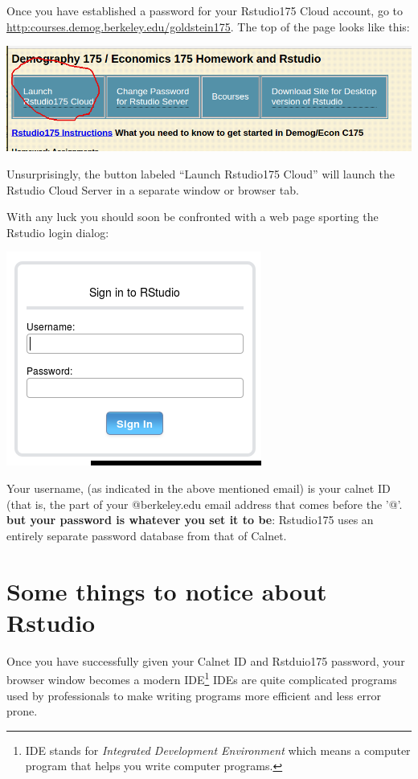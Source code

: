 \documentclass[11pt]{article}
\begin{document}
Once you have established a password for your Rstudio175 Cloud account, go to 
\url{http:courses.demog.berkeley.edu/goldstein175}.  The top of the page looks like this:

\includegraphics[scale=.5]{WebsiteTop}

Unsurprisingly, the button labeled ``Launch Rstudio175 Cloud'' will launch the Rstudio Cloud Server in a separate window or browser tab. 

\vspace{.5cm}

With any luck you should soon be confronted with a web page sporting the Rstudio login dialog:

\includegraphics[scale=.35]{RstudioSignin}

Your username, (as indicated in the above mentioned email) is your
calnet ID (that is, the part of your @berkeley.edu email address that comes before the '@'. \textbf{but your password is whatever you set it to be}:
Rstudio175 uses an entirely separate password database from that of
Calnet.

\section{Some things to notice about Rstudio}

Once you have successfully given your Calnet ID and Rstduio175 password, your browser window becomes a modern IDE\footnote{IDE stands for \emph{Integrated Development Environment} which means a computer program that helps you write computer programs.} IDEs are quite complicated programs used by professionals to make writing programs more efficient and less error prone.
\end{document}
